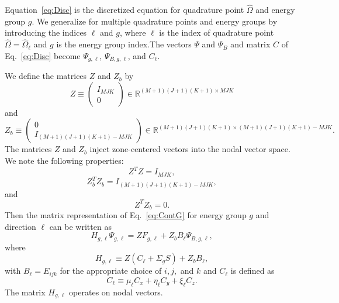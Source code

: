 Equation~\ref{eq:Disc} is the discretized equation for quadrature point $\hat{\Omega}$ and energy group $g$. We generalize for multiple quadrature points and energy groups by introducing the indices $\ell$ and $g$, where $\ell$ is the index of quadrature point $\hat{\Omega} = \hat{\Omega}_{\ell}$ and $g$ is the energy group index.The vectors $\Psi$ and $\Psi_{B}$ and matrix $C$ of Eq.~\ref{eq:Disc} become $\Psi_{g,\ell}$, $\Psi_{B,g,\ell}$, and $C_{\ell}$.

We define the matrices $Z$ and $Z_{b}$ by
\begin{equation}
	Z \equiv \begin{pmatrix}
				I_{MJK} \\
				0
		      \end{pmatrix} \in \mathbb{R}^{(M+1)(J+1)(K+1) \times MJK}
\end{equation}
and
\begin{equation}
	Z_{b} \equiv \begin{pmatrix}
				0 \\
				I_{(M+1)(J+1)(K+1) - MJK}
		      \end{pmatrix} \in \mathbb{R}^{(M+1)(J+1)(K+1) \times (M+1)(J+1)(K+1) - MJK}.
\end{equation}
The matrices $Z$ and $Z_{b}$ inject zone-centered vectors into the nodal vector space. We note the following properties:
\begin{equation}
	Z^{T} Z = I_{MJK},
\end{equation}
\begin{equation}
	Z_{b}^{T} Z_{b} = I_{(M+1)(J+1)(K+1) - MJK},
\end{equation}
and
\begin{equation}
	Z^{T} Z_{b} = 0.
\end{equation}
Then the matrix representation of Eq.~\ref{eq:ContG} for energy group $g$ and direction $\ell$ can be written as
\begin{equation}
	H_{g,\ell} \Psi_{g,\ell} = Z F_{g,\ell} + Z_{b} B_{\ell} \Psi_{B,g,\ell},
\end{equation}
where
\begin{equation}
	H_{g,\ell} \equiv Z(C_{\ell} + \Sigma_{g} S) + Z_{b} B_{\ell},
\end{equation}
with $B_{\ell} = E_{ijk}$ for the appropriate choice of $i, j,$ and $k$ and $C_{\ell}$ is defined as
\begin{equation}
	C_{\ell} \equiv \mu_{\ell} C_{x} + \eta_{\ell} C_{y} + \xi_{\ell} C_{z}.
\end{equation}
The matrix $H_{g,\ell}$ operates on nodal vectors.

